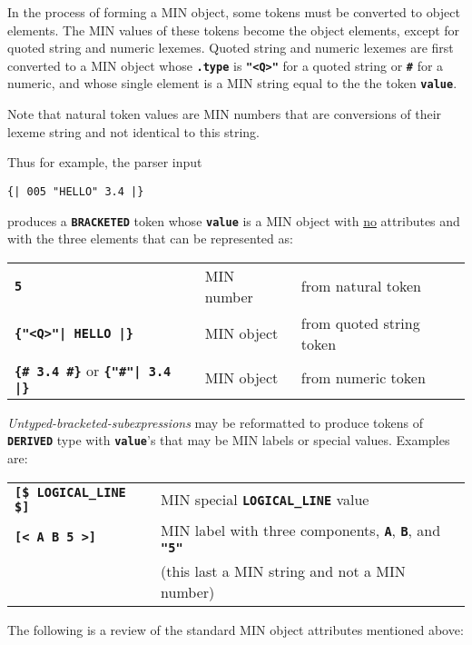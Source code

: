 \documentclass[12pt]{article}
\newcommand{\TT}[1]{{\tt \bfseries #1}}
\begin{document}
In the process of forming a MIN object, some tokens must be converted to
object elements.  The MIN values of these tokens become the object elements,
except for quoted string and numeric lexemes.
Quoted string and numeric lexemes
are first converted to a MIN object
whose \TT{.type} is \TT{"<Q>"} for a quoted string or \TT{\#} for
a numeric, and whose single element is a MIN string equal to the
the token \TT{value}.

Note that natural token values are MIN numbers that
are conversions of their lexeme string and not identical
to this string.

Thus for example, the parser input
\begin{center}
\tt \{| 005 "HELLO" 3.4 |\}
\end{center}
produces a \TT{BRACKETED} token whose \TT{value} is a MIN object with
\underline{no} attributes and with the three elements that
can be represented as:
\begin{center}
\begin{tabular}{lll}
\TT{5}	                        & MIN number	& from natural token \\
\TT{\{"<Q>"| HELLO |\}}		& MIN object	& from quoted string token \\
\TT{\{\# 3.4 \#\}} or \TT{\{"\#"| 3.4 |\}}
				& MIN object	& from numeric token \\
\end{tabular}
\end{center}

{\em Untyped-bracketed-subexpressions} may be reformatted to
produce tokens of \TT{DERIVED} type with \TT{value}'s that may be
MIN labels or special values.  Examples are:
\begin{center}
\begin{tabular}{ll}
\TT{[\$ LOGICAL\_LINE \$]}	& MIN special \TT{LOGICAL\_LINE} value \\
\TT{[< A B 5 >]}	& MIN label with three components, \TT{A}, \TT{B},
			  and \TT{"5"} \\
			& (this last a MIN string and not a MIN number) \\
\end{tabular}
\end{center}

The following is a review of the standard MIN object attributes
mentioned above:
\end{document}
